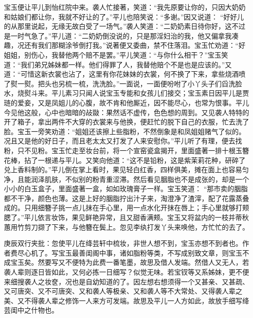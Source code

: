 \begin{parag}


    宝玉便让平儿到怡红院中来。袭人忙接著，笑道：“我先原要让你的，只因大奶奶和姑娘们都让你，我就不好让的了。”平儿也陪笑说：“多谢。”因又说道： “好好儿的从那里说起，无缘无故白受了一场气。”袭人笑道：“二奶奶素日待你好，这不过是一时气急了。”平儿道：“二奶奶倒没说的，只是那淫妇治的我，他又偏拿我凑趣，况还有我们那糊涂爷倒打我。”说著便又委曲，禁不住落泪。宝玉忙劝道：“好姐姐，别伤心，我替他两个赔不是罢。”平儿笑道：“与你什么相干？”宝玉笑道：“我们弟兄姊妹都一样。他们得罪了人，我替他赔个不是也是应该的。”又道：“可惜这新衣裳也沾了，这里有你花妹妹的衣裳，何不换了下来，拿些烧酒喷了熨一熨。把头也另梳一梳，洗洗脸。”一面说，一面便吩咐了小丫头子们舀洗脸水，烧熨斗来。平儿素习只闻人说宝玉专能和女孩儿们接交；宝玉素日因平儿是贾琏的爱妾，又是凤姐儿的心腹，故不肯和他厮近，因不能尽心，也常为恨事。平儿今见他这般，心中也暗暗的敁敠：果然话不虚传，色色想的周到。又见袭人特特的开了箱子，拿出两件不大穿的衣裳来与他换，便赶忙的脱下自己的衣服，忙去洗了脸。宝玉一旁笑劝道：“姐姐还该擦上些脂粉，不然倒象是和凤姐姐赌气了似的。况且又是他的好日子，而且老太太又打发了人来安慰你。”平儿听了有理，便去找粉，只不见粉。宝玉忙走至妆台前，将一个宣窑瓷盒揭开，里面盛著一排十根玉簪花棒，拈了一根递与平儿。又笑向他道：“这不是铅粉，这是紫茉莉花种，研碎了兑上香料制的。”平儿倒在掌上看时，果见轻白红香，四样俱美，摊在面上也容易匀净，且能润泽肌肤，不似别的粉青重涩滞。然后看见胭脂也不是成张的，却是一个小小的白玉盒子，里面盛著一盒，如如玫瑰膏子一样。宝玉笑道： “那市卖的胭脂都不干净，颜色也薄。这是上好的胭脂拧出汁子来，淘澄净了渣滓，配了花露蒸叠成的。只用细簪子挑一点儿抹在手心里，用一点水化开抹在唇上；手心里就够打颊腮了。”平儿依言妆饰，果见鲜艳异常，且又甜香满颊。宝玉又将盆内的一枝并蒂秋蕙用竹剪刀撷了下来，与他簪在鬓上。忽见李纨打发丫头来唤他，方忙忙的去了。\begin{note}庚辰双行夹批：忽使平儿在绛芸轩中梳妆，非世人想不到，宝玉亦想不到者也。作者费尽心机了。写宝玉最善闺阁中事，诸如脂粉等类，不写成别致文章，则宝玉不成宝玉矣。然要写又不便特为此费一番笔墨，故思及借人发端。然借人又无人，若袭人辈则逐日皆如此，又何必拣一日细写？似觉无味。若宝钗等又系姊妹，更不便来细搜袭人之妆奁，况也是自幼知道的了。因左想右想须得一个又甚亲、又甚疏、又可唐突、又不可唐突、又和袭人等极亲、又和袭人等不大常处、又得袭人辈之美、又不得袭人辈之修饰一人来方可发端。故思及平儿一人方如此，故放手细写绛芸闺中之什物也。\end{note}
\end{parag}


